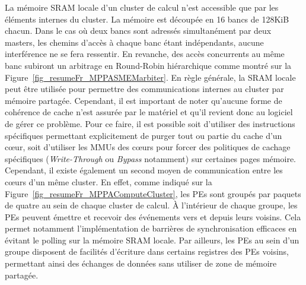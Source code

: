 \documentclass[main.tex]{subfiles}
\begin{document}
La mémoire SRAM locale d'un cluster de calcul n'est accessible que par les éléments internes du cluster. La mémoire est découpée en 16 bancs de 128KiB chacun. Dans le cas où deux bancs sont adressés simultanément par deux masters, les chemins d'accès à chaque banc étant indépendants, aucune interférence ne se fera ressentir. En revanche, des accès concurrents au même banc subiront un arbitrage en Round-Robin hiérarchique comme montré sur la Figure~\ref{fig_resumeFr_MPPASMEMarbiter}. En règle générale, la SRAM locale peut être utilisée pour permettre des communications internes au cluster par mémoire partagée. Cependant, il est important de noter qu'aucune forme de cohérence de cache n'est assurée par le matériel et qu'il revient donc au logiciel de gérer ce problème. Pour ce faire, il est possible soit d'utiliser des instructions spécifiques permettant explicitement de purger tout ou partie du cache d'un c\oe{}ur, soit d'utiliser les MMUs des c\oe{}urs pour forcer des politiques de cachage spécifiques (\emph{Write-Through} ou \emph{Bypass} notamment) sur certaines pages mémoire. Cependant, il existe également un second moyen de communication entre les c\oe{}urs d'un même cluster. En effet, comme indiqué sur la Figure~\ref{fig_resumeFr_MPPAComputeCluster}, les PEs sont groupés par paquets de quatre au sein de chaque cluster de calcul. À l'intérieur de chaque groupe, les PEs peuvent émettre et recevoir des événements vers et depuis leurs voisins. Cela permet notamment l'implémentation de barrières de synchronisation efficaces en évitant le polling sur la mémoire SRAM locale. Par ailleurs, les PEs au sein d'un groupe disposent de facilités d'écriture dans certains registres des PEs voisins, permettant ainsi des échanges de données sans utiliser de zone de mémoire partagée.
\end{document}
